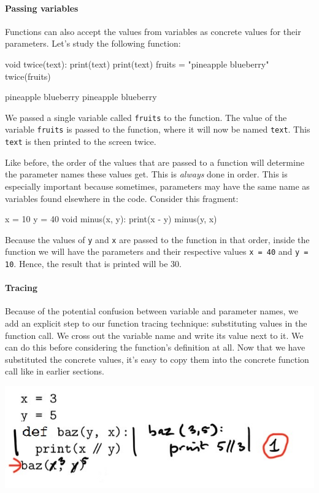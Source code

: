 \paragraph{Passing variables}

Functions can also accept the values from variables as concrete values for their parameters. Let's study the following function:

\begin{minipage}[t]{0.45\textwidth}
\vspace{-3pt}
\begin{nllisting}
void twice(text):
    print(text)
    print(text)
fruits = "pineapple blueberry"
twice(fruits)
\end{nllisting}
\end{minipage}
\begin{minipage}[t]{0.45\textwidth}
\vspace{0pt}
\begin{listing}
pineapple blueberry
pineapple blueberry
\end{listing}
\end{minipage}

We passed a single variable called \texttt{fruits} to the function. The value of the variable \texttt{fruits} is passed to the function, where it will now be named \texttt{text}. This \texttt{text} is then printed to the screen twice.

Like before, the order of the values that are passed to a function will determine the parameter names these values get. This is \emph{always} done in order. This is especially important because sometimes, parameters may have the same name as variables found elsewhere in the code. Consider this fragment:

\begin{nnflisting}
x = 10
y = 40
void minus(x, y):
    print(x - y)
minus(y, x)
\end{nnflisting}

Because the values of \texttt{y} and \texttt{x} are passed to the function in that order, inside the function we will have the parameters and their respective values \texttt{x = 40} and \texttt{y = 10}. Hence, the result that is printed will be 30.

\paragraph{Tracing}

Because of the potential confusion between variable and parameter names, we add an explicit step to our function tracing technique: substituting values in the function call. We cross out the variable name and write its value next to it. We can do this before considering the function's definition at all. Now that we have substituted the concrete values, it's easy to copy them into the concrete function call like in earlier sections.

\includegraphics[width=.8\textwidth]{3-trace-varsparams.jpeg}
